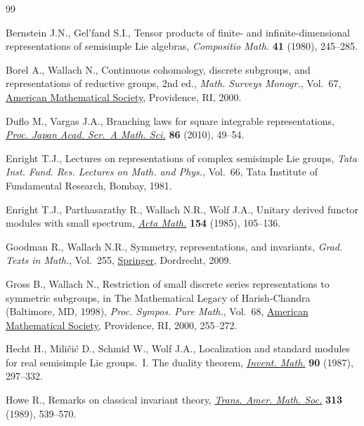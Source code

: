 \begin{thebibliography}{99}
\footnotesize\itemsep=0pt

Bernstein J.N., Gel'fand S.I., Tensor products of finite- and
 infinite-dimensional representations of semisimple {L}ie algebras,
 \textit{Compositio Math.} \textbf{41} (1980), 245--285.

Borel A., Wallach N., Continuous cohomology, discrete subgroups, and
 representations of reductive groups, 2nd ed., \textit{Math. Surveys Monogr.}, Vol.~67, \href{https://doi.org/10.1090/surv/067}{American Mathematical Society}, Providence, RI, 2000.

Duflo M., Vargas J.A., Branching laws for square integrable representations,
 \href{https://doi.org/10.3792/pjaa.86.49}{\textit{Proc. Japan Acad. Ser.~A
 Math. Sci.}} \textbf{86} (2010), 49--54.

Enright T.J., Lectures on representations of complex semisimple {L}ie groups,
 \textit{Tata Inst. Fund. Res. Lectures on Math. and Phys.}, Vol.~66, Tata
 Institute of Fundamental Research, Bombay, 1981.

Enright T.J., Parthasarathy R., Wallach N.R., Wolf J.A., Unitary derived
 functor modules with small spectrum,
 \href{https://doi.org/10.1007/BF02392820}{\textit{Acta Math.}} \textbf{154}
 (1985), 105--136.

Goodman R., Wallach N.R., Symmetry, representations, and invariants,
 \textit{Grad. Texts in Math.}, Vol.~255,
 \href{https://doi.org/10.1007/978-0-387-79852-3}{Springer}, Dordrecht, 2009.

Gross B., Wallach N., Restriction of small discrete series representations to
 symmetric subgroups, in The Mathematical Legacy of {H}arish-{C}handra
 ({B}altimore, {MD}, 1998), \textit{Proc. Sympos. Pure Math.}, Vol.~68,
 \href{https://doi.org/10.1090/pspum/068/1767899}{American Mathematical
 Society}, Providence, RI, 2000, 255--272.

Hecht H., Mili\v{c}i\'c D., Schmid W., Wolf J.A., Localization and standard
 modules for real semisimple {L}ie groups.~{I}. {T}he duality theorem,
 \href{https://doi.org/10.1007/BF01388707}{\textit{Invent. Math.}} \textbf{90}
 (1987), 297--332.

Howe R., Remarks on classical invariant theory,
 \href{https://doi.org/10.2307/2001418}{\textit{Trans. Amer. Math. Soc.}}
 \textbf{313} (1989), 539--570.


\end{thebibliography}
